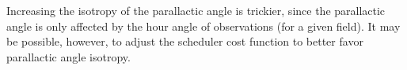 Increasing the isotropy of the parallactic angle is trickier, since the parallactic angle is only
affected by the hour angle of observations (for a given field).  It may be possible, however, to
adjust the scheduler cost function to better favor parallactic angle isotropy.


%
%
%
%
%
%
